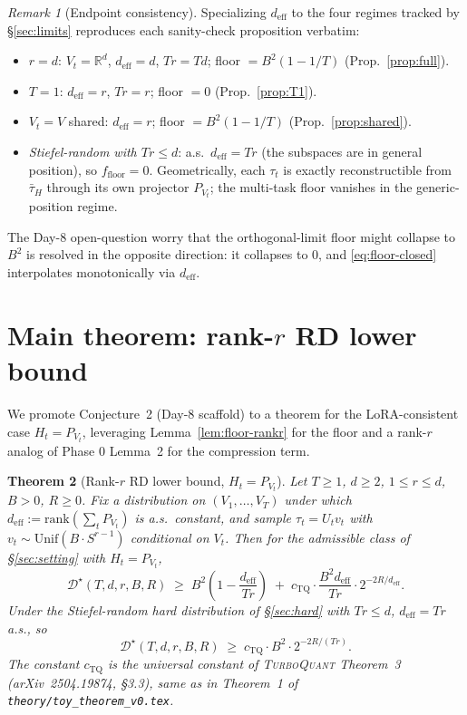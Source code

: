 \documentclass{article}
\newtheorem{theorem}{Theorem}
\theoremstyle{remark}
\newtheorem{remark}[theorem]{Remark}
\newcommand{\R}{\mathbb{R}}
\newcommand{\rank}{\mathrm{rank}}
\newcommand{\deff}{d_{\mathrm{eff}}}
\newcommand{\tauH}{\bar\tau_{H}}
\begin{document}
\begin{remark}[Endpoint consistency]\label{rem:floor-endpoints}
Specializing $\deff$ to the four regimes tracked by \S\ref{sec:limits}
reproduces each sanity-check proposition verbatim:
\begin{itemize}
  \item $r = d$: $V_t = \R^d$, $\deff = d$, $Tr = Td$; floor
    $= B^2(1-1/T)$ (Prop.~\ref{prop:full}).
  \item $T = 1$: $\deff = r$, $Tr = r$; floor $= 0$
    (Prop.~\ref{prop:T1}).
  \item $V_t = V$ shared: $\deff = r$; floor $= B^2(1-1/T)$
    (Prop.~\ref{prop:shared}).
  \item \emph{Stiefel-random with $Tr \leq d$}: a.s.\ $\deff = Tr$
    (the subspaces are in general position), so $f_{\mathrm{floor}} = 0$.
    Geometrically, each $\tau_t$ is exactly reconstructible from
    $\tauH$ through its own projector $P_{V_t}$; the multi-task floor
    vanishes in the generic-position regime.
\end{itemize}
The Day-8 open-question worry that the orthogonal-limit floor might
collapse to $B^2$ is resolved in the opposite direction: it collapses
to $0$, and \eqref{eq:floor-closed} interpolates monotonically via
$\deff$.
\end{remark}

\section{Main theorem: rank-$r$ RD lower bound}\label{sec:thm}

We promote Conjecture~2 (Day-8 scaffold) to a theorem for the
LoRA-consistent case $H_t = P_{V_t}$, leveraging
Lemma~\ref{lem:floor-rankr} for the floor and a rank-$r$ analog of
Phase 0 Lemma~2 for the compression term.

\begin{theorem}[Rank-$r$ RD lower bound, $H_t = P_{V_t}$]\label{thm:rankr}
Let $T\geq 1$, $d\geq 2$, $1\leq r\leq d$, $B > 0$, $R\geq 0$. Fix a
distribution on $(V_1,\dots,V_T)$ under which $\deff := \rank(\sum_t
P_{V_t})$ is a.s.\ constant, and sample $\tau_t = U_t v_t$ with
$v_t \sim \mathrm{Unif}(B\cdot S^{r-1})$ conditional on $V_t$. Then
for the admissible class of \S\ref{sec:setting} with $H_t = P_{V_t}$,
\begin{equation}\label{eq:thm}
  \mathcal{D}^\star(T, d, r, B, R)
  \;\geq\;
  B^2\!\left(1 - \frac{\deff}{Tr}\right)
  \;+\; c_{\mathrm{TQ}}\cdot\frac{B^2\deff}{Tr}
  \cdot 2^{-2R/\deff}.
\end{equation}
Under the Stiefel-random hard distribution of \S\ref{sec:hard} with
$Tr \leq d$, $\deff = Tr$ a.s., so
\begin{equation}\label{eq:thm-stiefel}
  \mathcal{D}^\star(T, d, r, B, R)
  \;\geq\;
  c_{\mathrm{TQ}}\cdot B^2\cdot 2^{-2R/(Tr)}.
\end{equation}
The constant $c_{\mathrm{TQ}}$ is the universal constant of
\textsc{TurboQuant} Theorem~3 (arXiv~2504.19874, \S3.3), same as in
Theorem~1 of \texttt{theory/toy\_theorem\_v0.tex}.
\end{theorem}
\end{document}

